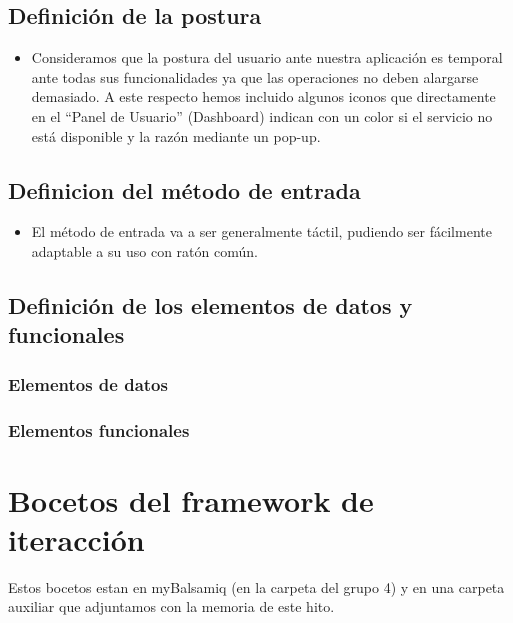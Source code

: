 \documentclass[12pt]{article}
\begin{document}
\subsection{Definición de la postura}
\begin{itemize}

\item Consideramos que la postura del usuario ante nuestra aplicación es temporal ante todas sus funcionalidades ya que las operaciones no deben alargarse demasiado. A este respecto hemos incluido algunos iconos que directamente en el “Panel de Usuario” (Dashboard) indican con un color si el servicio no está disponible y la razón mediante un pop-up.

\end{itemize}
\subsection{Definicion del método de entrada}
\begin{itemize}

\item El método de entrada va a ser generalmente táctil, pudiendo ser fácilmente adaptable a su uso con ratón común.

\end{itemize}
\subsection{Definición de los elementos de datos y funcionales }
    \subsubsection{Elementos de datos}
    \subsubsection{Elementos funcionales}


\newpage
\section{Bocetos del framework de iteracción}

Estos bocetos estan en myBalsamiq (en la carpeta del grupo 4) y en una carpeta auxiliar que adjuntamos con la memoria de este hito.
\end{document}
